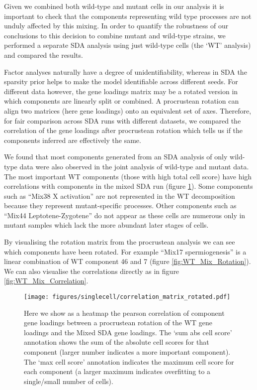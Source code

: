 Given we combined both wild-type and mutant cells in our analysis it is important to check that the components representing wild type processes are not unduly affected by this mixing. In order to quantify the robustness of our conclusions to this decision to combine mutant and wild-type strains, we performed a separate SDA analysis using just wild-type cells (the ‘WT’ analysis) and compared the results.

Factor analyses naturally have a degree of unidentifiability, whereas in SDA the sparsity prior helps to make the model identifiable across different seeds. For different data however, the gene loadings matrix may be a rotated version in which components are linearly split or combined. A procrustean rotation can align two matrices (here gene loadings) onto an equivalent set of axes. Therefore, for fair comparison across SDA runs with different datasets, we compared the correlation of the gene loadings after procrustean rotation which tells us if the components inferred are effectively the same.

We found that most components generated from an SDA analysis of only wild-type data were also observed in the joint analysis of wild-type and mutant data. The most important WT components (those with high total cell score) have high correlations with components in the mixed SDA run (figure \ref{fig:WT_vs_Mixed}). Some components such as ``Mix38 X activation'' are not represented in the WT decomposition because they represent mutant-specific processes. Other components such as ``Mix44 Leptotene-Zygotene'' do not appear as these cells are numerous only in mutant samples which lack the more abundant later stages of cells.

By visualising the rotation matrix from the procrustean analysis we can see which components have been rotated. For example ``Mix17 spermiogenesis'' is a linear combination of WT component 46 and 7 (figure \ref{fig:WT_Mix_Rotation}). We can also visualise the correlations directly as in figure \ref{fig:WT_Mix_Correlation}.

\begin{figure}[H]
	\centering
	\texttt{[image: figures/singlecell/correlation\_matrix\_rotated.pdf]}
	\caption[Wild Type vs Mixed SDA]{Here we show as a heatmap the pearson correlation of component gene loadings between a procrustean rotation of the WT gene loadings and the Mixed SDA gene loadings. The ‘sum abs cell score’ annotation shows the sum of the absolute cell scores for that component (larger number indicates a more important component). The ‘max cell score’ annotation indicates the maximum cell score for each component (a larger maximum indicates overfitting to a single/small number of cells).}
	\label{fig:WT_vs_Mixed}
\end{figure}

